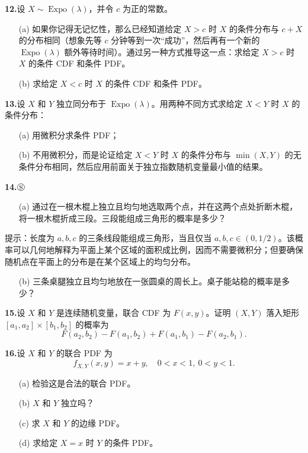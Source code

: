 \documentclass[UTF8,12pt,a4paper,fontset=fandol]{ctexart}
\begin{document}
\noindent\textbf{12.}\quad 设 $X\sim \operatorname{Expo}(\lambda)$，并令 $c$ 为正的常数。
\begin{enumerate}
  \item[(a)] 如果你记得无记忆性，那么已经知道给定 $X>c$ 时 $X$ 的条件分布与 $c+X$ 的分布相同（想象先等 $c$ 分钟等到一次“成功”，然后再有一个新的 $\operatorname{Expo}(\lambda)$ 额外等待时间）。通过另一种方式推导这一点：求给定 $X>c$ 时 $X$ 的条件 CDF 和条件 PDF。
  \item[(b)] 求给定 $X<c$ 时 $X$ 的条件 CDF 和条件 PDF。
\end{enumerate}

\noindent\textbf{13.}\quad 设 $X$ 和 $Y$ 独立同分布于 $\operatorname{Expo}(\lambda)$。用两种不同方式求给定 $X<Y$ 时 $X$ 的条件分布：
\begin{enumerate}
  \item[(a)] 用微积分求条件 PDF；
  \item[(b)] 不用微积分，而是论证给定 $X<Y$ 时 $X$ 的条件分布与 $\min(X,Y)$ 的无条件分布相同，然后应用前面关于独立指数随机变量最小值的结果。
\end{enumerate}

\noindent\textbf{14.}\quad $\circledS$
\begin{enumerate}
  \item[(a)] 通过在一根木棍上独立且均匀地选取两个点，并在这两个点处折断木棍，将一根木棍折成三段。三段能组成三角形的概率是多少？
\end{enumerate}
提示：长度为 $a,b,c$ 的三条线段能组成三角形，当且仅当 $a,b,c\in(0,1/2)$。该概率可以几何地解释为平面上某个区域的面积成比例，因而不需要微积分；但要确保随机点在平面上的分布是在某个区域上的均匀分布。
\begin{enumerate}
  \item[(b)] 三条桌腿独立且均匀地放在一张圆桌的周长上。桌子能站稳的概率是多少？
\end{enumerate}

\noindent\textbf{15.}\quad 设 $X$ 和 $Y$ 是连续随机变量，联合 CDF 为 $F(x,y)$。证明 $(X,Y)$ 落入矩形 $[a_1,a_2]\times [b_1,b_2]$ 的概率为
\[
  F(a_2,b_2)-F(a_1,b_2)+F(a_1,b_1)-F(a_2,b_1).
\]

\noindent\textbf{16.}\quad 设 $X$ 和 $Y$ 的联合 PDF 为
\[
  f_{X,Y}(x,y)=x+y,\quad 0<x<1,\ 0<y<1.
\]
\begin{enumerate}
  \item[(a)] 检验这是合法的联合 PDF。
  \item[(b)] $X$ 和 $Y$ 独立吗？
  \item[(c)] 求 $X$ 和 $Y$ 的边缘 PDF。
  \item[(d)] 求给定 $X=x$ 时 $Y$ 的条件 PDF。
\end{enumerate}
\end{document}
